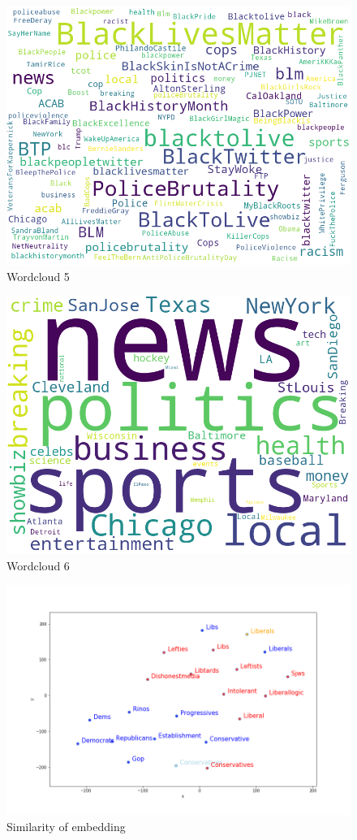 \documentclass[12pt, authoryear]{elsarticle}
\begin{document}
\begin{figure}[H]
\includegraphics[width=5in]{wordcloud5}
\centering
\caption{Wordcloud 5}
\label{wordcloud:5}
\end{figure}

\begin{figure}[H]
\includegraphics[width=5in]{wordcloud6}
\centering
\caption{Wordcloud 6}
\label{wordcloud:6}
\end{figure}

\begin{figure}[H]
\includegraphics[width=6in]{embedding_liberals_conservatives}
\centering
\caption{Similarity of embedding}
\label{embedding:1}
\end{figure}
\end{document}
